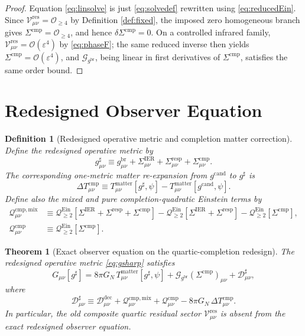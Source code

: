 \documentclass[11pt]{article}
\newcommand{\ObserverMetric}{g^{\mathrm{br}}}
\newcommand{\CandidateMetric}{g^{\mathrm{cand}}}
\newcommand{\CompletedMetric}{g^{\sharp}}
\newcommand{\BaseShift}{\Sigma^{\mathrm{IER}}}
\newcommand{\ResponseShift}{\Sigma^{\mathrm{resp}}}
\newcommand{\CompShift}{\Sigma^{\mathrm{cmp}}}
\newcommand{\DeltaTComp}{\Delta T_{\mu\nu}^{\mathrm{cmp}}}
\newcommand{\EinQuad}{\mathcal Q_{\ge 2}^{\mathrm{Ein}}}
\newcommand{\GaugeBook}{\mathcal G_{\ObserverMetric}}
\newcommand{\ResidualCore}{\mathcal V_{\mu\nu}^{\mathrm{res}}}
\newcommand{\ResidualDec}{\mathcal D_{\mu\nu}^{\mathrm{dec}}}
\newcommand{\CompMix}{\mathcal Q_{\mu\nu}^{\mathrm{cmp,mix}}}
\newcommand{\CompQuad}{\mathcal Q_{\mu\nu}^{\mathrm{cmp}}}
\newcommand{\CompDec}{\mathcal D_{\mu\nu}^{\sharp}}
\newcommand{\epsIR}{\varepsilon}
\newtheorem{definition}{Definition}
\newtheorem{theorem}{Theorem}
\begin{document}
\begin{proof}
Equation \eqref{eq:linsolve} is just \eqref{eq:solvedef} rewritten using \eqref{eq:reducedEin}. Since \(\ResidualCore=\mathcal O_{\ge 4}\) by Definition \ref{def:fixed}, the imposed zero homogeneous branch gives \(\CompShift=\mathcal O_{\ge 4}\), and hence \(\delta\CompShift=0\). On a controlled infrared family, \(\ResidualCore=\mathcal O(\epsIR^4)\) by \eqref{eq:phaseF}; the same reduced inverse then yields \(\CompShift=\mathcal O(\epsIR^4)\), and \(\GaugeBook\), being linear in first derivatives of \(\CompShift\), satisfies the same order bound.
\end{proof}

\section{Redesigned Observer Equation}

\begin{definition}[Redesigned operative metric and completion matter correction]
\label{def:metric}
Define the redesigned operative metric by
\begin{equation}
\CompletedMetric_{\mu\nu}
\equiv
\ObserverMetric_{\mu\nu}
+\BaseShift_{\mu\nu}
+\ResponseShift_{\mu\nu}
+\CompShift_{\mu\nu}.
\label{eq:gsharp}
\end{equation}
The corresponding one-metric matter re-expansion from \(\CandidateMetric\) to \(\CompletedMetric\) is
\begin{equation}
\DeltaTComp
\equiv
T_{\mu\nu}^{\mathrm{matter}}[\CompletedMetric,\psi]
-T_{\mu\nu}^{\mathrm{matter}}[\CandidateMetric,\psi].
\label{eq:deltatcomp}
\end{equation}
Define also the mixed and pure completion-quadratic Einstein terms by
\begin{align}
\CompMix
&\equiv
\EinQuad[\BaseShift+\ResponseShift+\CompShift]
-\EinQuad[\BaseShift+\ResponseShift]
-\EinQuad[\CompShift],
\label{eq:compmix}
\\
\CompQuad
&\equiv
\EinQuad[\CompShift].
\label{eq:compquad}
\end{align}
\end{definition}

\begin{theorem}[Exact observer equation on the quartic-completion redesign]
\label{thm:observer}
The redesigned operative metric \eqref{eq:gsharp} satisfies
\begin{equation}
G_{\mu\nu}[\CompletedMetric]
=
8\pi G_N\,T_{\mu\nu}^{\mathrm{matter}}[\CompletedMetric,\psi]
+\GaugeBook(\CompShift)_{\mu\nu}
+\CompDec,
\label{eq:newobs}
\end{equation}
where
\begin{equation}
\CompDec
\equiv
\ResidualDec+\CompMix+\CompQuad-8\pi G_N\,\DeltaTComp.
\label{eq:newdec}
\end{equation}
In particular, the old composite quartic residual sector \(\ResidualCore\) is absent from the exact redesigned observer equation.
\end{theorem}
\end{document}
